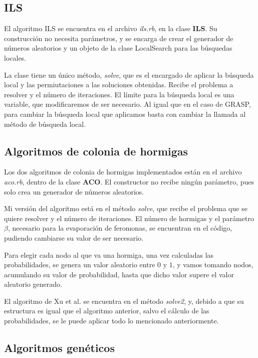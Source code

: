 \subsection{ILS}

El algoritmo ILS se encuentra en el archivo \textit{ils.rb}, en la clase \textbf{ILS}.
Su construcción no necesita parámetros, y se encarga de crear el generador de números
aleatorios y un objeto de la clase LocalSearch para las búsquedas locales.

La clase tiene un único método, \textit{solve}, que es el encargado de aplicar la
búsqueda local y las permiutaciones a las soluciones obtenidas. Recibe el problema
a resolver y el número de iteraciones. El límite para la búsqueda local es una
variable, que modificaremos de ser necesario. Al igual que en el caso de GRASP,
para cambiar la búsqueda local que aplicamos basta con cambiar la llamada al método
de búsqueda local.

\subsection{Algoritmos de colonia de hormigas}

Los dos algoritmos de colonia de hormigas implementados están en el archivo \textit{aco.rb},
dentro de la clase \textbf{ACO}. El constructor no recibe ningún parámetro, pues solo
crea un generador de números aleatorios.

Mi versión del algoritmo está en el método \textit{solve}, que recibe el problema que
se quiere resolver y el número de iteraciones. El número de hormigas y el parámetro
$\beta$, necesario para la evaporación de feromonas, se encuentran en el código,
pudiendo cambiarse su valor de ser necesario.

Para elegir cada nodo al que va una hormiga, una vez calculadas las probabilidades,
se genera un valor aleatorio entre $0$ y $1$, y vamos tomando nodos, acumulando su
valor de probabilidad, hasta que dicho valor supere el valor aleatorio generado.

El algoritmo de Xu et al. se encuentra en el método \textit{solve2}, y, debido a que
su estructura es igual que el algoritmo anterior, salvo el cálculo de las probabilidades,
se le puede aplicar todo lo mencionado anteriormente.

\subsection{Algoritmos genéticos}

